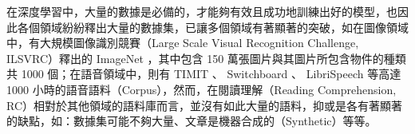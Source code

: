 在深度學習中，大量的數據是必備的，才能夠有效且成功地訓練出好的模型，也因此各個領域紛紛釋出大量的數據集，已讓多個領域有著顯著的突破，如在圖像領域中，有大規模圖像識別競賽（Large Scale Visual Recognition Challenge, ILSVRC）釋出的 ImageNet \cite{imagenet_cvpr09} ，其中包含 150 萬張圖片與其圖片所包含物件的種類共 1000 個；在語音領域中，則有 TIMIT 、 Switchboard 、 LibriSpeech 等高達 1000 小時的語音語料（Corpus），然而，在閱讀理解（Reading Comprehension, RC）相對於其他領域的語料庫而言，並沒有如此大量的語料，抑或是各有著顯著的缺點，如：數據集可能不夠大量、文章是機器合成的（Synthetic）等等。

%
